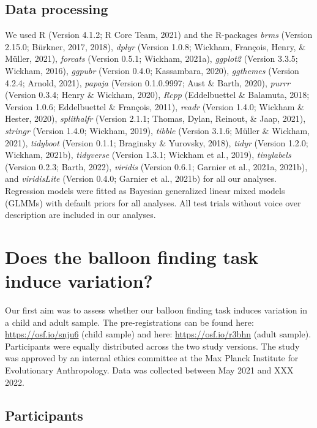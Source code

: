 \documentclass[
  man,floatsintext]{apa6}
\begin{document}
\hypertarget{data-processing-1}{%
\subsection{Data processing}\label{data-processing-1}}

We used R (Version 4.1.2; R Core Team, 2021) and the R-packages \emph{brms} (Version 2.15.0; Bürkner, 2017, 2018), \emph{dplyr} (Version 1.0.8; Wickham, François, Henry, \& Müller, 2021), \emph{forcats} (Version 0.5.1; Wickham, 2021a), \emph{ggplot2} (Version 3.3.5; Wickham, 2016), \emph{ggpubr} (Version 0.4.0; Kassambara, 2020), \emph{ggthemes} (Version 4.2.4; Arnold, 2021), \emph{papaja} (Version 0.1.0.9997; Aust \& Barth, 2020), \emph{purrr} (Version 0.3.4; Henry \& Wickham, 2020), \emph{Rcpp} (Eddelbuettel \& Balamuta, 2018; Version 1.0.6; Eddelbuettel \& François, 2011), \emph{readr} (Version 1.4.0; Wickham \& Hester, 2020), \emph{splithalfr} (Version 2.1.1; Thomas, Dylan, Reinout, \& Jaap, 2021), \emph{stringr} (Version 1.4.0; Wickham, 2019), \emph{tibble} (Version 3.1.6; Müller \& Wickham, 2021), \emph{tidyboot} (Version 0.1.1; Braginsky \& Yurovsky, 2018), \emph{tidyr} (Version 1.2.0; Wickham, 2021b), \emph{tidyverse} (Version 1.3.1; Wickham et al., 2019), \emph{tinylabels} (Version 0.2.3; Barth, 2022), \emph{viridis} (Version 0.6.1; Garnier et al., 2021a, 2021b), and \emph{viridisLite} (Version 0.4.0; Garnier et al., 2021b) for all our analyses. Regression models were fitted as Bayesian generalized linear mixed models (GLMMs) with default priors for all analyses.
All test trials without voice over description are included in our analyses.

\hypertarget{does-the-balloon-finding-task-induce-variation}{%
\section{Does the balloon finding task induce variation?}\label{does-the-balloon-finding-task-induce-variation}}

Our first aim was to assess whether our balloon finding task induces variation in a child and adult sample. The pre-registrations can be found here: \url{https://osf.io/snju6} (child sample) and here: \url{https://osf.io/r3bhn} (adult sample). Participants were equally distributed across the two study versions. The study was approved by an internal ethics committee at the Max Planck Institute for Evolutionary Anthropology. Data was collected between May 2021 and XXX 2022.

\hypertarget{participants}{%
\subsection{Participants}\label{participants}}
\end{document}
